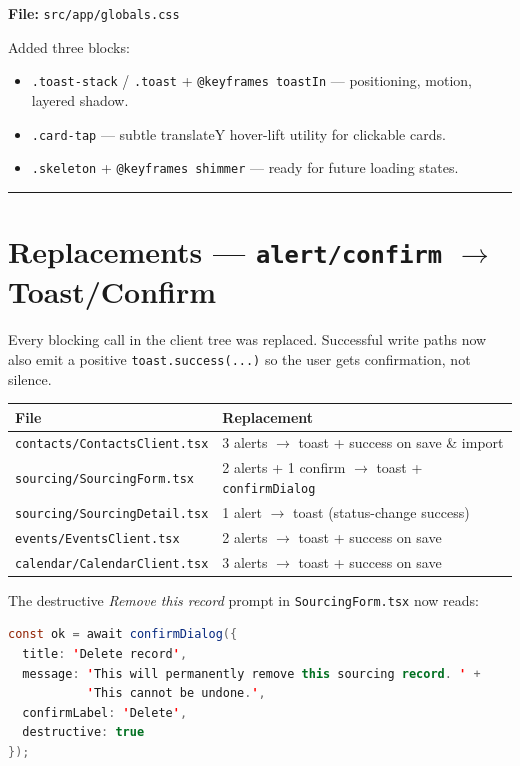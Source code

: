 \documentclass[11pt,a4paper]{article}
\begin{document}
\textbf{File:} \texttt{src/app/globals.css}

Added three blocks:

\begin{itemize}[leftmargin=*]
  \item \texttt{.toast-stack} / \texttt{.toast} +
        \texttt{@keyframes toastIn} --- positioning, motion, layered shadow.
  \item \texttt{.card-tap} --- subtle translateY hover-lift utility for
        clickable cards.
  \item \texttt{.skeleton} + \texttt{@keyframes shimmer} ---
        ready for future loading states.
\end{itemize}

\hrule
\bigskip

\section{Replacements --- \texttt{alert/confirm} $\to$ Toast/Confirm}

Every blocking call in the client tree was replaced. Successful
write paths now also emit a positive \texttt{toast.success(...)} so the
user gets confirmation, not silence.

\begin{center}
\begin{tabular}{ll}
\toprule
\textbf{File} & \textbf{Replacement} \\
\midrule
\texttt{contacts/ContactsClient.tsx} & 3 alerts $\to$ toast + success on save \& import \\
\texttt{sourcing/SourcingForm.tsx}   & 2 alerts + 1 confirm $\to$ toast + \texttt{confirmDialog} \\
\texttt{sourcing/SourcingDetail.tsx} & 1 alert $\to$ toast (status-change success) \\
\texttt{events/EventsClient.tsx}     & 2 alerts $\to$ toast + success on save \\
\texttt{calendar/CalendarClient.tsx} & 3 alerts $\to$ toast + success on save \\
\bottomrule
\end{tabular}
\end{center}

The destructive \emph{Remove this record} prompt in
\texttt{SourcingForm.tsx} now reads:

\begin{lstlisting}[language=Java]
const ok = await confirmDialog({
  title: 'Delete record',
  message: 'This will permanently remove this sourcing record. ' +
           'This cannot be undone.',
  confirmLabel: 'Delete',
  destructive: true
});
\end{lstlisting}
\end{document}
